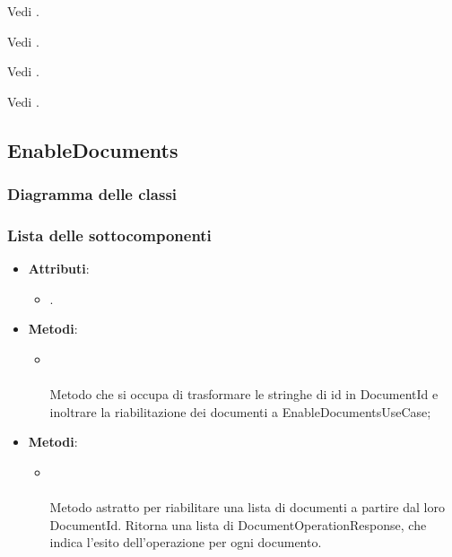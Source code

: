 \documentclass[10pt, a4paper]{article}
\begin{document}
Vedi .

Vedi .

Vedi .

Vedi .

\subsection{EnableDocuments}
\subsubsection{Diagramma delle classi}
\subsubsection{Lista delle sottocomponenti}

\label{EnableDocumentsControllerDettaglio}
\begin{itemize}
    \item \textbf{Attributi}:
    \begin{itemize}
        \item {}.
    \end{itemize}
    \item \textbf{Metodi}:
    \begin{itemize}
        \item {}\\ \\
        Metodo che si occupa di trasformare le stringhe di id in DocumentId e inoltrare la riabilitazione dei documenti a EnableDocumentsUseCase;
    \end{itemize}
\end{itemize}

\label{EnableDocumentsUseCaseDettaglio}
\begin{itemize}
    \item \textbf{Metodi}:
    \begin{itemize}
        \item {}\\ \\
        Metodo astratto per riabilitare una lista di documenti a partire dal loro DocumentId. Ritorna una lista di DocumentOperationResponse, che indica l'esito dell'operazione per ogni documento.
    \end{itemize}
\end{itemize}
\end{document}
